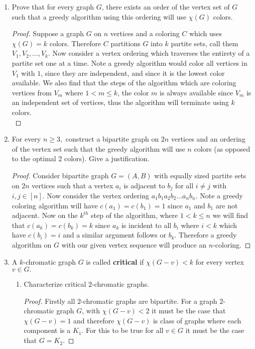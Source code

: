 \documentclass[12pt]{article}
\renewcommand{\emph}[1]{\textsf{\textbf{#1}}}
\begin{document}
\begin{enumerate}
	\item Prove that for every graph $G$, there exists an order of the vertex set of $G$ such that a greedy algorithm using this ordering will use $\chi(G)$ colors.
	\begin{proof} Suppose a graph $G$ on $n$ vertices and a coloring $C$ which uses $\chi(G) = k$ colors. Therefore $C$ partitions $G$ into $k$ partite sets, call them $V_1, V_2, \dots, V_k$. Now consider a vertex ordering which traverses the entirety of a partite set one at a time. Note a greedy algorithm would color all vertices in $V_1$ with $1$, since they are independent, and since it is the lowest color available. We also find that the steps of the algorithm which are coloring vertices from $V_m$ where $1 < m \leq k$, the color $m$ is always available since $V_m$ is an independent set of vertices, thus the algorithm will terminate using $k$ colors.  
	\begin{equation*}
	\end{equation*}
	\end{proof}
	\newpage











	\item For every $n \geq 3,$ construct a bipartite graph on $2n$ vertices and an ordering of the vertex set such that the greedy algorithm will use $n$ colors (as opposed to the optimal 2 colors). Give a justification.
	\begin{proof} Consider bipartite graph $G = (A,B)$ with equally sized partite sets on $2n$ vertices such that a vertex $a_i$ is adjacent to $b_j$ for all $i \neq j$ with $i, j \in [n]$. Now consider the vertex ordering $a_1b_1a_2b_2\dots a_nb_n$. Note a greedy coloring algorithm will have $c(a_1) = c(b_1) = 1$ since $a_1$ and $b_1$ are not adjacent. Now on the $k^{th}$ step of the algorithm, where $1 < k \leq n$ we will find that $c(a_k) = c(b_k) = k$ since $a_k$ is incident to all $b_i$ where $i < k$ which have $c(b_i) = i$ and a similar argument follows or $b_k$. Therefore a greedy algorithm on $G$ with our given vertex sequence will produce an $n$-coloring. 
 	\end{proof}
	\newpage
	
	\item A $k$-chromatic graph $G$ is called \emph{critical} if $\chi(G-v) < k$ for every vertex $v \in G.$
	\begin{enumerate}
	\item Characterize critical $2$-chromatic graphs.
	\begin{proof} Firstly all $2$-chromatic graphs are bipartite. For a graph $2$-chromatic graph $G$, with $\chi(G-v) < 2$ it must be the case that $\chi(G-v) = 1$ and therefore $\chi(G-v)$ is class of graphs where each component is a $K_1$. For this to be true for all $v \in G$ it must be the case that $G = K_2$.  
 		

\end{proof}
\end{enumerate}
\end{enumerate}
\end{document}
